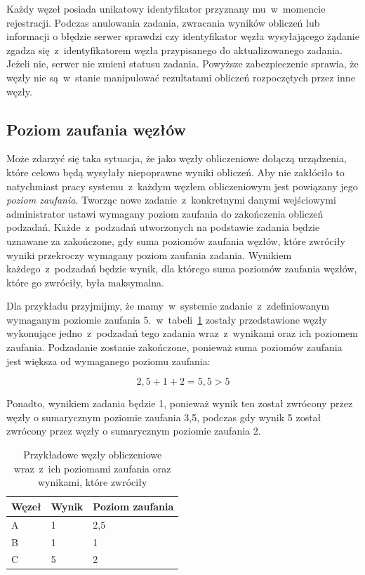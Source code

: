 \documentclass[a4paper,11pt,twoside]{report}
\theoremstyle{definition}
\begin{document}
Każdy węzeł posiada unikatowy identyfikator przyznany mu~w~momencie rejestracji.
Podczas anulowania zadania, zwracania wyników obliczeń lub informacji o błędzie serwer sprawdzi czy identyfikator węzła wysyłającego żądanie zgadza się~z~identyfikatorem węzła przypisanego do aktualizowanego zadania.
Jeżeli nie, serwer nie zmieni statusu zadania.
Powyższe zabezpieczenie sprawia, że węzły nie są~w~stanie manipulować rezultatami obliczeń rozpoczętych przez inne węzły.

\subsection{Poziom zaufania węzłów}
\label{poziom-zaufania-wezlow}

Może zdarzyć się taka sytuacja, że jako węzły obliczeniowe dołączą urządzenia, które celowo będą wysyłały niepoprawne wyniki obliczeń. 
Aby nie zakłóciło to natychmiast pracy systemu~z~każdym węzłem obliczeniowym jest powiązany jego \textit{poziom zaufania}. Tworząc nowe zadanie~z~konkretnymi danymi wejściowymi administrator ustawi wymagany poziom zaufania do zakończenia obliczeń podzadań.
Każde~z~podzadań utworzonych na podstawie zadania będzie uznawane za zakończone, gdy suma poziomów zaufania węzłów, które zwróciły wyniki przekroczy wymagany poziom zaufania zadania.
Wynikiem każdego~z~podzadań będzie wynik, dla którego suma poziomów zaufania węzłów, które go zwróciły, była maksymalna.

Dla przykładu przyjmijmy, że mamy~w~systemie zadanie~z~zdefiniowanym wymaganym poziomie zaufania 5.~w~tabeli~\ref{trust-level-example} zostały przedstawione węzły wykonujące jedno~z~podzadań tego zadania wraz~z~wynikami oraz ich poziomem zaufania.
Podzadanie zostanie zakończone, ponieważ suma poziomów zaufania jest większa od wymaganego poziomu zaufania:

\[2,5 + 1 + 2 = 5,5 > 5\]

Ponadto, wynikiem zadania będzie 1, ponieważ wynik ten został zwrócony przez węzły o sumarycznym poziomie zaufania 3,5, podczas gdy wynik 5 został zwrócony przez węzły o sumarycznym poziomie zaufania 2.

\begin{table}
    \centering
    \caption{Przykładowe węzły obliczeniowe wraz~z~ich poziomami zaufania oraz wynikami, które zwróciły}
    \label{trust-level-example}
    \begin{tabular}{|l|l|l|}
        \hline
        Węzeł & Wynik & Poziom zaufania \\ \hline
        A     & 1     & 2,5             \\ \hline
        B     & 1     & 1               \\ \hline
        C     & 5     & 2               \\ \hline
    \end{tabular}
\end{table}
\end{document}
